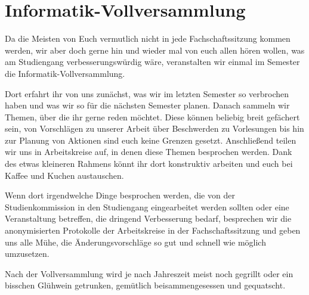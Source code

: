 \section{Informatik-Vollversammlung}
Da die Meisten von Euch vermutlich nicht in jede Fachschaftssitzung kommen werden, wir aber doch gerne hin und wieder mal von euch allen hören wollen, was am Studiengang verbesserungswürdig wäre, veranstalten wir einmal im Semester die Informatik-Vollversammlung.

Dort erfahrt ihr von uns zunächst, was wir im letzten Semester so verbrochen haben und was wir so für die nächsten Semester planen. Danach sammeln wir Themen, über die ihr gerne reden möchtet. Diese können beliebig breit gefächert sein, von Vorschlägen zu unserer Arbeit über Beschwerden zu Vorlesungen bis hin zur Planung von Aktionen sind euch keine Grenzen gesetzt. Anschließend teilen wir uns in Arbeitskreise auf, in denen diese Themen besprochen werden. Dank des etwas kleineren Rahmens könnt ihr dort konstruktiv arbeiten und euch bei Kaffee und Kuchen austauschen.

Wenn dort irgendwelche Dinge besprochen werden, die von der Studienkommission in den Studiengang eingearbeitet werden sollten oder eine Veranstaltung betreffen, die dringend Verbesserung bedarf, besprechen wir die anonymisierten Protokolle der Arbeitskreise in der Fachschaftssitzung und geben uns alle Mühe, die Änderungsvorschläge so gut und schnell wie möglich umzusetzen.

Nach der Vollversammlung wird je nach Jahreszeit meist noch gegrillt oder ein bisschen Glühwein getrunken, gemütlich beisammengesessen und gequatscht.
